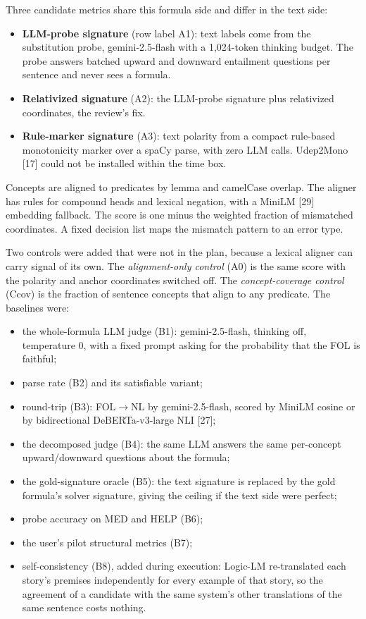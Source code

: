 \documentclass[11pt,letterpaper]{article}
\begin{document}
Three candidate metrics share this formula side and differ in the text side:

\begin{itemize}
\item {}\textbf{LLM-probe signature} (row label A1): text labels come from the substitution probe, gemini-2.5-flash with a 1,024-token thinking budget. The probe answers batched upward and downward entailment questions per sentence and never sees a formula.
\item {}\textbf{Relativized signature} (A2): the LLM-probe signature plus relativized coordinates, the review's fix.
\item {}\textbf{Rule-marker signature} (A3): text polarity from a compact rule-based monotonicity marker over a spaCy parse, with zero LLM calls. Udep2Mono [17] could not be installed within the time box.
\end{itemize}
Concepts are aligned to predicates by lemma and camelCase overlap. The aligner has rules for compound heads and lexical negation, with a MiniLM [29] embedding fallback. The score is one minus the weighted fraction of mismatched coordinates. A fixed decision list maps the mismatch pattern to an error type.

Two controls were added that were not in the plan, because a lexical aligner can carry signal of its own. The \emph{alignment-only control} (A0) is the same score with the polarity and anchor coordinates switched off. The \emph{concept-coverage control} (Ccov) is the fraction of sentence concepts that align to any predicate. The baselines were:

\begin{itemize}
\item {}the whole-formula LLM judge (B1): gemini-2.5-flash, thinking off, temperature 0, with a fixed prompt asking for the probability that the FOL is faithful;
\item {}parse rate (B2) and its satisfiable variant;
\item {}round-trip (B3): FOL$\rightarrow$NL by gemini-2.5-flash, scored by MiniLM cosine or by bidirectional DeBERTa-v3-large NLI [27];
\item {}the decomposed judge (B4): the same LLM answers the same per-concept upward/downward questions about the formula;
\item {}the gold-signature oracle (B5): the text signature is replaced by the gold formula's solver signature, giving the ceiling if the text side were perfect;
\item {}probe accuracy on MED and HELP (B6);
\item {}the user's pilot structural metrics (B7);
\item {}self-consistency (B8), added during execution: Logic-LM re-translated each story's premises independently for every example of that story, so the agreement of a candidate with the same system's other translations of the same sentence costs nothing.
\end{itemize}
\end{document}
